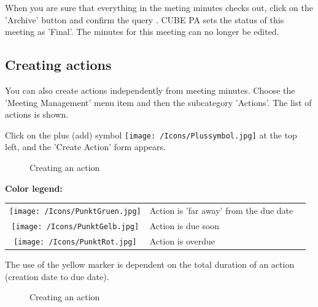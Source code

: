 When you are sure that everything in the meting minutes checks out, click on the 'Archive' button  and confirm the query . CUBE PA sets the status of this meeting as 'Final'. The minutes for this meeting can no longer be edited.

\subsection{Creating actions}

You can also create actions independently from meeting minutes. Choose the 'Meeting Management' menu item and then the subcategory 'Actions'. The list of actions is shown.

\vspace{\baselineskip}

Click on the plus (add) symbol \texttt{[image: /Icons/Plussymbol.jpg]}  at the top left, and the 'Create Action' form appears.

\begin{figure}[H]
\caption{Creating an action}
\end{figure}

\textbf{Color legend:}

\begin{tabular}{c p{14cm} l} %
\texttt{[image: /Icons/PunktGruen.jpg]} & Action is 'far away' from the due date \\
\texttt{[image: /Icons/PunktGelb.jpg]} & Action is due soon \\
\texttt{[image: /Icons/PunktRot.jpg]} & Action is overdue \\
\end{tabular}

\vspace{\baselineskip}

The use of the yellow marker is dependent on the total duration of an action (creation date to due date).

\begin{figure}[H]
\caption{Creating an action}
\end{figure}

